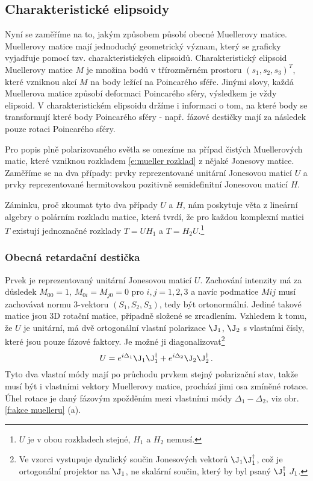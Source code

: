 \subsection{Charakteristické elipsoidy \cite{Muellergeom}}

Nyní se zaměříme na to, jakým způsobem působí obecné Muellerovy matice.
Muellerovy matice mají jednoduchý geometrický význam, který se graficky vyjadřuje pomocí tzv. charakteristických elipsoidů.
Charakteristický elipsoid Muellerovy matice $M$ je množina bodů v třírozměrném prostoru $(s_1, s_2, s_3)^T$, které vzniknou akcí $M$ na body ležící na Poincarého sféře.
Jinými slovy, každá Muellerova matice způsobí deformaci Poincarého sféry, výsledkem je vždy elipsoid.
V charakteristickém elipsoidu držíme i informaci o tom, na které body se transformují které body Poincarého sféry - např. fázové destičky mají za následek pouze rotaci Poincarého sféry. 

Pro popis plně polarizovaného světla se omezíme na případ čistých Muellerových matic, které vzniknou rozkladem \eqref{e:mueller rozklad} z nějaké Jonesovy matice.
Zaměříme se na dva případy: prvky reprezentované unitární Jonesovou maticí $U$ a prvky reprezentované hermitovskou pozitivně semidefinitní Jonesovou maticí $H$.

Záminku, proč zkoumat tyto dva případy $U$ a $H$, nám poskytuje věta z lineární algebry o polárním rozkladu matice\cite{pestujemealgebru}, která tvrdí, že pro každou komplexní matici $T$ existují jednoznačné rozklady $T=U H_1$ a $T=H_2 U$.\footnote{$U$ je v obou rozkladech stejné, $H_1$ a $H_2$ nemusí.}

\subsubsection*{Obecná retardační destička}

Prvek je reprezentovaný unitární Jonesovou maticí $U$.
Zachování intenzity má za důsledek $M_{00}=1$, $M_{0i}=M_{j0}=0$ pro $i,j=1,2,3$ a navíc podmatice $M{ij}$ musí zachovávat normu 3-vektoru $(S_1, S_2, S_3)$, tedy být ortonormální.
Jediné takové matice jsou 3D rotační matice, případně složené se zrcadlením.
Vzhledem k tomu, že $U$ je unitární, má dvě ortogonální vlastní polarizace $\J_1$, $\J_2$ s vlastními čísly, které jsou pouze fázové faktory. Je možné ji diagonalizovat\footnote{Ve vzorci vystupuje dyadický součin Jonesových vektorů $\J_1\J_1^\dagger$, což je ortogonální projektor na $\J_1$, ne skalární součin, který by byl psaný $\J_1^\dagger\ J_1$.}
\begin{equation}
U=e^{i\Delta_1} \J_1 \J_1^\dagger + e^{i\Delta_2} \J_2 \J_2^\dagger\,.
\end{equation}
Tyto dva vlastní módy mají po průchodu prvkem stejný polarizační stav, takže musí být i vlastními vektory Muellerovy matice, prochází jimi osa zmíněné rotace.
Úhel rotace je daný fázovým zpožděním mezi vlastními módy $\Delta_1-\Delta_2$, viz obr. \ref{f:akce muelleru} (a).

